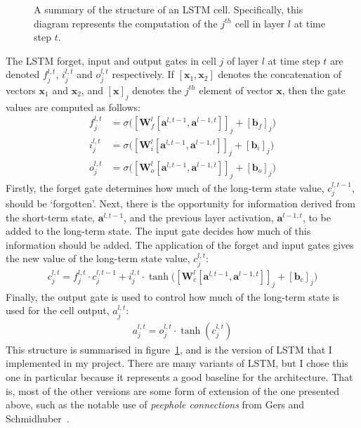 \documentclass[a4paper, 12pt]{report}
\newcommand{\tit}[1]{\textit{#1}}
\begin{document}
\begin{figure}[h]
\caption{A summary of the structure of an LSTM cell. Specifically, this diagram represents the computation of the $j^{th}$ cell in layer $l$ at time step $t$.}
\label{fig:lstm_structure}
\end{figure}

The LSTM forget, input and output gates in cell $j$ of layer $l$ at time step $t$ are denoted $f_j^{l, t}$, $i_j^{l, t}$ and $o_j^{l, t}$ respectively. If $[\mathbf{x}_1, \mathbf{x}_2]$ denotes the concatenation of vectors $\mathbf{x}_1$ and $\mathbf{x}_2$, and $[\mathbf{x}]_j$ denotes the $j^{th}$ element of vector $\mathbf{x}$, then the gate values are computed as follows:
\begin{align}
	f_j^{l, t} &= \sigma \big( [\mathbf{W}_f^l [\mathbf{a}^{l, t - 1}, \mathbf{a}^{l - 1, t}]]_j + [\mathbf{b}_f]_j \big) \\
	i_j^{l, t} &= \sigma \big( [\mathbf{W}_i^l [\mathbf{a}^{l, t - 1}, \mathbf{a}^{l - 1, t}]]_j + [\mathbf{b}_i]_j \big) \\
	o_j^{l, t} &= \sigma \big( [\mathbf{W}_o^l [\mathbf{a}^{l, t - 1}, \mathbf{a}^{l - 1, t}]]_j + [\mathbf{b}_o]_j \big)
\end{align}
Firstly, the forget gate determines how much of the long-term state value, $c_j^{l, t - 1}$, should be `forgotten'. Next, there is the opportunity for information derived from the short-term state, $\mathbf{a}^{l, t - 1}$, and the previous layer activation, $\mathbf{a}^{l - 1, t}$, to be added to the long-term state. The input gate decides how much of this information should be added. The application of the forget and input gates gives the new value of the long-term state value, $c_j^{l, t}$:
\begin{gather}
	c_j^{l, t} = f_j^{l, t} \cdot c_j^{l, t - 1} + i_j^{l, t} \cdot \tanh \big( [\mathbf{W}_c^l [\mathbf{a}^{l, t - 1}, \mathbf{a}^{l - 1, t}]]_j + [\mathbf{b}_c]_j \big)
\end{gather}
Finally, the output gate is used to control how much of the long-term state is used for the cell output, $a_j^{l, t}$:
\begin{gather}
	a_j^{l, t} = o_j^{l, t} \cdot \tanh (c_j^{l, t})
\end{gather}
This structure is summarised in figure~\ref{fig:lstm_structure}, and is the version of LSTM that I implemented in my project. There are many variants of LSTM, but I chose this one in particular because it represents a good baseline for the architecture. That is, most of the other versions are some form of extension of the one presented above, such as the notable use of \tit{peephole connections} from Gers and Schmidhuber~\cite{peephole:gers2000}.
\end{document}
